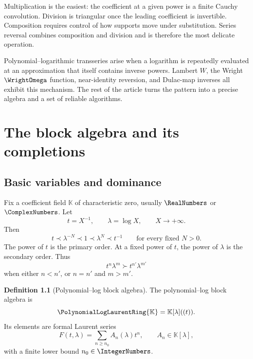 \documentclass[11pt,openany]{book}
\theoremstyle{definition}
\newtheorem{definition}{Definition}[chapter]
\theoremstyle{plain}
\theoremstyle{remark}
\newcommand{\K}{\mathbb{K}}
\newcommand{\Plog}{\PolynomialLogLaurentRing{\K}}
\newcommand{\precdom}{\prec}
\newcommand{\succdom}{\succ}
\begin{document}
Multiplication is the easiest: the coefficient at a given power is a finite Cauchy convolution. Division is triangular once the leading coefficient is invertible. Composition requires control of how supports move under substitution. Series reversal combines composition and division and is therefore the most delicate operation.

\begin{summarybox}
Polynomial--logarithmic transseries arise when a logarithm is repeatedly evaluated at an approximation that itself contains inverse powers. Lambert \(W\), the Wright \(\WrightOmega\) function, near-identity reversion, and Dulac-map inverses all exhibit this mechanism. The rest of the article turns the pattern into a precise algebra and a set of reliable algorithms.
\end{summarybox}

\chapter{The block algebra and its completions}\label{ch:block-algebra}

\section{Basic variables and dominance}
Fix a coefficient field \(\K\) of characteristic zero, usually \(\RealNumbers\) or \(\ComplexNumbers\). Let
\begin{equation}\label{eq:t-lambda}
 t=X^{-1},\qquad \lambda=\log X,
 \qquad X\to+\infty.
\end{equation}
Then
\[
 t\precdom \lambda^{-N}\precdom1\precdom\lambda^N\precdom t^{-1}
 \qquad\text{for every fixed }N>0.
\]
The power of \(t\) is the primary order. At a fixed power of \(t\), the power of \(\lambda\) is the secondary order. Thus
\[
 t^n\lambda^m\succdom t^{n'}\lambda^{m'}
\]
when either \(n<n'\), or \(n=n'\) and \(m>m'\).

\begin{definition}[Polynomial--log block algebra]\label{def:Plog}
The polynomial--log block algebra is
\begin{equation}\label{eq:Plog}
 \Plog=\K[\lambda]((t)).
\end{equation}
Its elements are formal Laurent series
\begin{equation}\label{eq:block-form}
 F(t,\lambda)=\sum_{n\ge n_0} A_n(\lambda)t^n,
 \qquad A_n\in\K[\lambda],
\end{equation}
with a finite lower bound \(n_0\in\IntegerNumbers\).
\end{definition}
\end{document}
